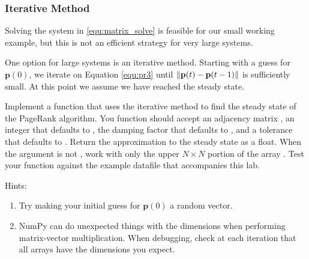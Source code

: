 \subsubsection*{Iterative Method}
Solving the system in \eqref{equ:matrix_solve} is feasible for our small working example, but this is not an efficient strategy for very large systems.

One option for large systems is an iterative method.
Starting with a guess for $\mathbf{p}(0)$, we iterate on Equation \eqref{equ:pr3} until $\left\lVert\mathbf{p}(t)-\mathbf{p}(t-1)\right\rVert$ is sufficiently small.
At this point we assume we have reached the steady state.


\begin{problem}
\label{prob:pagerank_dense_iter}
Implement a function that uses the iterative method to find the steady state of the PageRank algorithm. You function should accept an adjacency matrix , an integer  that defaults to , the damping factor  that defaults to , and a tolerance  that defaults to . Return the approximation to the steady state as a float.
When the argument  is not , work with only the upper $N \times N$ portion of the array .
Test your function against the example datafile that accompanies this lab.\\

Hints:
\begin{enumerate}
\item Try making your initial guess for $\mathbf{p}(0)$ a random vector.
\item NumPy can do unexpected things with the dimensions when performing matrix-vector multiplication.
When debugging, check at each iteration that all arrays have the dimensions you expect.
\end{enumerate}
\end{problem}

